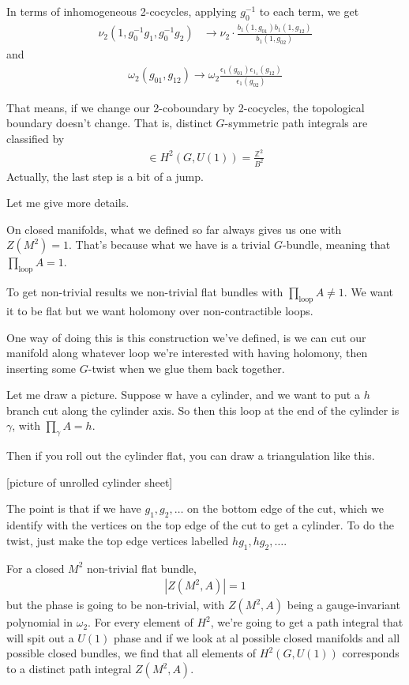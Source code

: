 In terms of inhomogeneous 2-cocycles,
applying $g_0^{-1}$ to each term,
we get
\begin{align}
    \nu_2(1, g_0^{-1} g_1, g_{0}^{-1} g_2)
    &\to
    \nu_2 \cdot
    \frac{b_1(1, g_{01}) b_1(1, g_{12})}{b_1(1, g_{02})}
\end{align}
and
\begin{align}
    \omega_2(g_{01}, g_{12}) \to
    \omega_2
    \frac{\epsilon_1(g_{01}) \epsilon_1_1\left( g_{12} \right)}{\epsilon_1\left(
    g_{02} \right)}
\end{align}

That means, if we change our 2-coboundary by 2-cocycles,
the topological boundary doesn't change.
That is,
distinct $G$-symmetric path integrals are classified by
\begin{align}
    [\nu_2] \in
    H^2\left( G, U(1) \right)
    = \frac{\mathbb{Z}^2}{B^2}
\end{align}
Actually,
the last step is a bit of a jump.

Let me give more details.

On closed manifolds,
what we defined so far always gives us one with
$Z(M^2)=1$.
That's because what we have is a trivial $G$-bundle,
meaning that
$\prod_{\textrm{loop}}A=1$.

To get non-trivial results we non-trivial flat bundles with
$\prod_{\textrm{loop}}A \ne 1$.
We want it to be flat but we want holomony over non-contractible loops.

One way of doing this is this construction we've defined,
is we can cut our manifold along whatever loop we're interested with having
holomony,
then inserting some $G$-twist when we glue them back together.

Let me draw a picture.
Suppose w have a cylinder,
and we want to put a $h$ branch cut along the cylinder axis.
So then this loop at the end of the cylinder is $\gamma$,
with $\prod_\gamma A = h$.

Then if you roll out the cylinder flat,
you can draw a triangulation like this.

[picture of unrolled cylinder sheet]

The point is that if we have $g_1,g_2,\ldots$ on the bottom edge of the cut,
which we identify with the vertices on the top edge of the cut to get a
cylinder.
To do the twist,
just make the top edge vertices labelled $hg_1, hg_2, \ldots$.

For a closed $M^2$
non-trivial flat bundle,
\begin{align}
    |Z(M^2, A)| = 1
\end{align}
but the phase is going to be non-trivial,
with $Z(M^2, A)$ being a gauge-invariant polynomial in $\omega_2$.
For every element of $H^2$,
we're going to get a path integral that will spit out a $U(1)$ phase and if we
look at al possible closed manifolds and all possible closed bundles,
we find that all elements of $H^2(G, U(1))$ corresponds to a distinct path
integral $Z(M^2, A)$.

